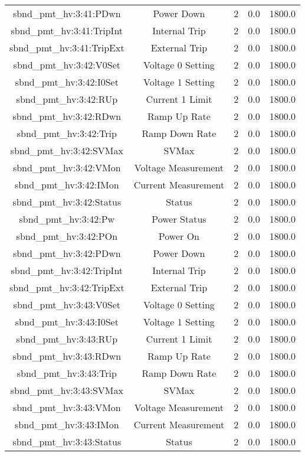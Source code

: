 \begin{center}
\begin{longtable}{c | c c c c }
sbnd\_pmt\_hv:3:41:PDwn & Power Down & 2 & 0.0 & 1800.0\\ 
sbnd\_pmt\_hv:3:41:TripInt & Internal Trip & 2 & 0.0 & 1800.0\\ 
sbnd\_pmt\_hv:3:41:TripExt & External Trip & 2 & 0.0 & 1800.0\\ 
sbnd\_pmt\_hv:3:42:V0Set & Voltage 0 Setting & 2 & 0.0 & 1800.0\\ 
sbnd\_pmt\_hv:3:42:I0Set & Voltage 1 Setting & 2 & 0.0 & 1800.0\\ 
sbnd\_pmt\_hv:3:42:RUp & Current 1 Limit & 2 & 0.0 & 1800.0\\ 
sbnd\_pmt\_hv:3:42:RDwn & Ramp Up Rate & 2 & 0.0 & 1800.0\\ 
sbnd\_pmt\_hv:3:42:Trip & Ramp Down Rate & 2 & 0.0 & 1800.0\\ 
sbnd\_pmt\_hv:3:42:SVMax & SVMax & 2 & 0.0 & 1800.0\\ 
sbnd\_pmt\_hv:3:42:VMon & Voltage Measurement & 2 & 0.0 & 1800.0\\ 
sbnd\_pmt\_hv:3:42:IMon & Current Measurement & 2 & 0.0 & 1800.0\\ 
sbnd\_pmt\_hv:3:42:Status & Status & 2 & 0.0 & 1800.0\\ 
sbnd\_pmt\_hv:3:42:Pw & Power Status & 2 & 0.0 & 1800.0\\ 
sbnd\_pmt\_hv:3:42:POn & Power On & 2 & 0.0 & 1800.0\\ 
sbnd\_pmt\_hv:3:42:PDwn & Power Down & 2 & 0.0 & 1800.0\\ 
sbnd\_pmt\_hv:3:42:TripInt & Internal Trip & 2 & 0.0 & 1800.0\\ 
sbnd\_pmt\_hv:3:42:TripExt & External Trip & 2 & 0.0 & 1800.0\\ 
sbnd\_pmt\_hv:3:43:V0Set & Voltage 0 Setting & 2 & 0.0 & 1800.0\\ 
sbnd\_pmt\_hv:3:43:I0Set & Voltage 1 Setting & 2 & 0.0 & 1800.0\\ 
sbnd\_pmt\_hv:3:43:RUp & Current 1 Limit & 2 & 0.0 & 1800.0\\ 
sbnd\_pmt\_hv:3:43:RDwn & Ramp Up Rate & 2 & 0.0 & 1800.0\\ 
sbnd\_pmt\_hv:3:43:Trip & Ramp Down Rate & 2 & 0.0 & 1800.0\\ 
sbnd\_pmt\_hv:3:43:SVMax & SVMax & 2 & 0.0 & 1800.0\\ 
sbnd\_pmt\_hv:3:43:VMon & Voltage Measurement & 2 & 0.0 & 1800.0\\ 
sbnd\_pmt\_hv:3:43:IMon & Current Measurement & 2 & 0.0 & 1800.0\\ 
sbnd\_pmt\_hv:3:43:Status & Status & 2 & 0.0 & 1800.0\\ 

\end{longtable}
\end{center}

